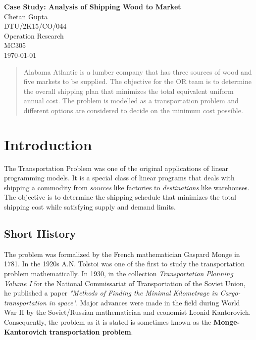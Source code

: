 \documentclass[12pt]{article}
\numberwithin{equation}{section}
\numberwithin{table}{section}
\numberwithin{figure}{section}
\begin{document}

\begin{center}
\textbf{\Large Case Study: Analysis of Shipping Wood to Market} \\[6pt]
  Chetan Gupta \\
  DTU/2K15/CO/044 \\
  Operation Research \\
  MC305 \\[6pt]
  \today
\end{center}

\begin{abstract}
Alabama Atlantic is a lumber company that has three sources of wood and five markets to be supplied. The objective for the OR team is to determine the overall shipping plan that minimizes the total equivalent uniform annual cost. The problem is modelled as a transportation problem and different options are considered to decide on the minimum cost possible.
\end{abstract}


\section{Introduction}
The Transportation Problem was one of the original applications of linear programming models. It is a special class of linear programs that deals with shipping a commodity from \textit{sources} like factories to \textit{destinations} like warehouses. The objective is to determine the shipping schedule that minimizes the total shipping cost while satisfying supply and demand limits.

\subsection{Short History}

The problem was formalized by the French mathematician Gaspard Monge in 1781. In the 1920s A.N. Tolstoi was one of the first to study the transportation problem mathematically. In 1930, in the collection \textit{Transportation Planning Volume I} for the National Commissariat of Transportation of the Soviet Union, he published a paper \textit{"Methods of Finding the Minimal Kilometrage in Cargo-transportation in space"}. Major advances were made in the field during World War II by the Soviet/Russian mathematician and economist Leonid Kantorovich. Consequently, the problem as it is stated is sometimes known as the \textbf{Monge-Kantorovich transportation problem}.
\end{document}
